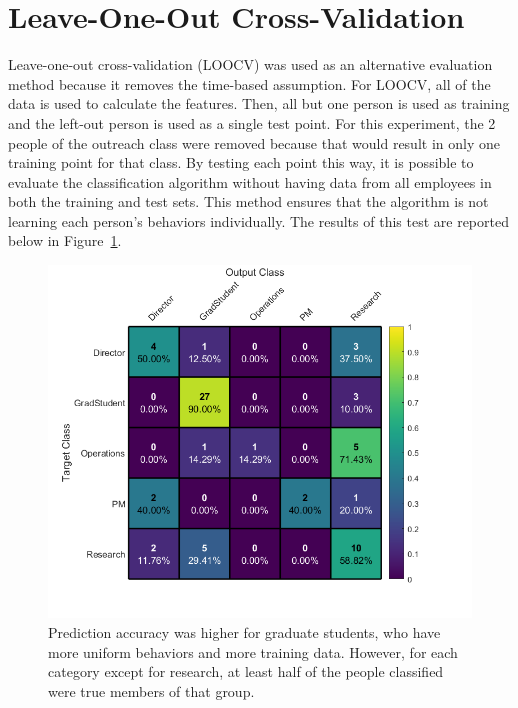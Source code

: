 \documentclass[12pt]{report}
\begin{document}
\section{Leave-One-Out Cross-Validation}
Leave-one-out cross-validation (LOOCV) was used as an alternative evaluation method because it removes the time-based assumption.
For LOOCV, all of the data is used to calculate the features.
Then, all but one person is used as training and the left-out person is used as a single test point.
For this experiment, the 2 people of the outreach class were removed because that would result in only one training point for that class.
By testing each point this way, it is possible to evaluate the classification algorithm without having data from all employees in both the training and test sets.
This method ensures that the algorithm is not learning each person's behaviors individually.
The results of this test are reported below in Figure~\ref{fig:loocv_conf_plot}.
\begin{figure}[t]
    \centering
        \includegraphics[width=.7\columnwidth,trim={0mm 0mm 0mm 0mm},clip]{LOOCV}
        \vspace{-7pt}
        \caption[Leave-one-out cross-validation results]{Prediction accuracy was higher for graduate students, who have more uniform behaviors and more training data.  However, for each category except for research, at least half of the people classified were true members of that group.}
        \label{fig:loocv_conf_plot}
\end{figure}
\end{document}
